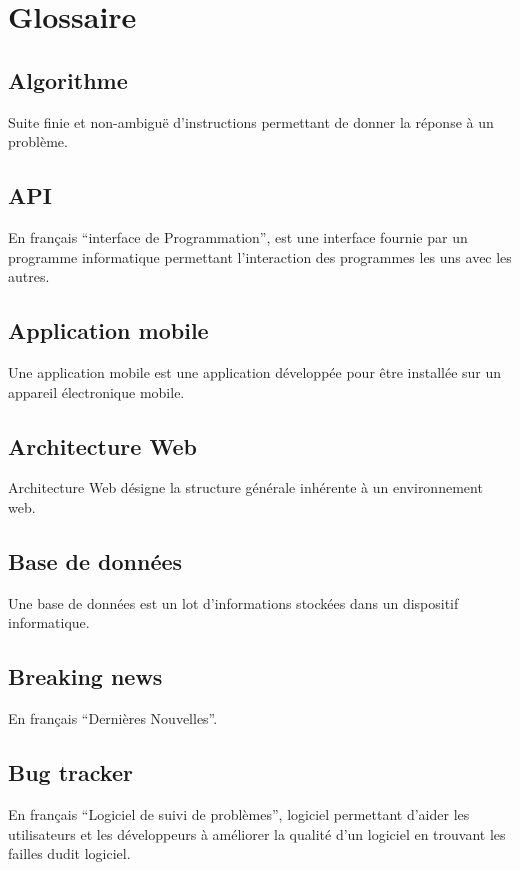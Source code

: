 \documentclass{life-fr}
\begin{document}
\newpage

\section{Glossaire}

\subsection{ Algorithme}
Suite finie et non-ambiguë d’instructions permettant de donner la réponse à un problème.

\subsection{ API}
En français ``interface de Programmation'', est une interface fournie par un programme informatique permettant l'interaction des programmes les uns avec les autres.

\subsection{ Application mobile}
Une application mobile est une application développée pour être installée sur un appareil électronique mobile.

\subsection{ Architecture Web}
Architecture Web désigne la structure générale inhérente à un environnement web.

\subsection{ Base de données}
Une base de données est un lot d'informations stockées dans un dispositif informatique.

\subsection{ Breaking news}
En français ``Dernières Nouvelles''.

\subsection{ Bug tracker}
En français ``Logiciel de suivi de problèmes'',  logiciel permettant d'aider les utilisateurs et les développeurs à améliorer la qualité d'un logiciel en trouvant les failles dudit logiciel.
\end{document}
